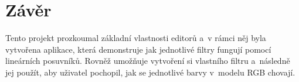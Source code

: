 \documentclass[11pt, a4paper, titlepage]{article}
\begin{document}
\section{Závěr}
Tento projekt prozkoumal základní vlastnosti editorů a~v rámci něj byla vytvořena aplikace, která demonstruje jak jednotlivé filtry fungují pomocí lineárních posuvníků.
Rovněž umožňuje vytvoření si vlastního filtru a~následně jej použít, aby uživatel pochopil, jak se jednotlivé barvy v~modelu RGB chovají.

\newpage


\begin{flushleft}
  
\end{flushleft}

\end{document}
